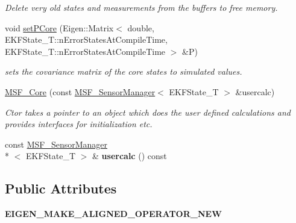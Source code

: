 \begin{DoxyCompactItemize}
\begin{DoxyCompactList}\small\item\em Delete very old states and measurements from the buffers to free memory. \end{DoxyCompactList}\item 
void \hyperlink{classmsf__core_1_1MSF__Core_a5f520250e12d56a8950f4fc355e58d69}{set\-P\-Core} (Eigen\-::\-Matrix$<$ double, E\-K\-F\-State\-\_\-\-T\-::n\-Error\-States\-At\-Compile\-Time, E\-K\-F\-State\-\_\-\-T\-::n\-Error\-States\-At\-Compile\-Time $>$ \&P)
\begin{DoxyCompactList}\small\item\em sets the covariance matrix of the core states to simulated values. \end{DoxyCompactList}\item 
\hyperlink{classmsf__core_1_1MSF__Core_ad55343b1396263b7a1f2b5599d0fc4e0}{M\-S\-F\-\_\-\-Core} (const \hyperlink{classmsf__core_1_1MSF__SensorManager}{M\-S\-F\-\_\-\-Sensor\-Manager}$<$ E\-K\-F\-State\-\_\-\-T $>$ \&usercalc)
\begin{DoxyCompactList}\small\item\em Ctor takes a pointer to an object which does the user defined calculations and provides interfaces for initialization etc. \end{DoxyCompactList}\item 
\hypertarget{classmsf__core_1_1MSF__Core_a4685230ba43fd684aaf6d6b891c29fca}{const \hyperlink{classmsf__core_1_1MSF__SensorManager}{M\-S\-F\-\_\-\-Sensor\-Manager}\\*
$<$ E\-K\-F\-State\-\_\-\-T $>$ \& {\bfseries usercalc} () const }\label{classmsf__core_1_1MSF__Core_a4685230ba43fd684aaf6d6b891c29fca}

\end{DoxyCompactItemize}
\subsection*{Public Attributes}
\begin{DoxyCompactItemize}
\item 
\hypertarget{classmsf__core_1_1MSF__Core_aad8769aeb9efa04de99604dd397a47a8}{{\bfseries E\-I\-G\-E\-N\-\_\-\-M\-A\-K\-E\-\_\-\-A\-L\-I\-G\-N\-E\-D\-\_\-\-O\-P\-E\-R\-A\-T\-O\-R\-\_\-\-N\-E\-W}}\label{classmsf__core_1_1MSF__Core_aad8769aeb9efa04de99604dd397a47a8}

\end{DoxyCompactItemize}
